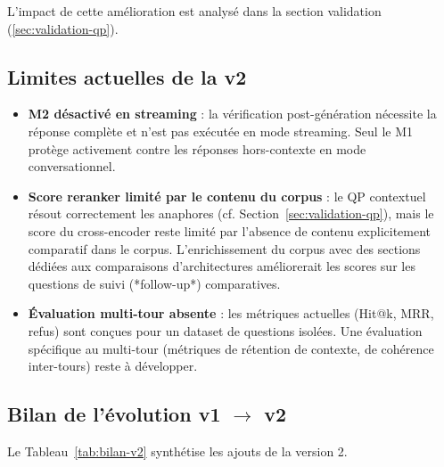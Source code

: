 L'impact de cette amélioration est analysé dans la section validation (\ref{sec:validation-qp}).

\subsection{Limites actuelles de la v2}

\begin{itemize}
  \item \textbf{M2 désactivé en streaming} : la vérification post-génération nécessite la réponse complète et n'est pas exécutée en mode streaming. Seul le M1 protège activement contre les réponses hors-contexte en mode conversationnel.

  \item \textbf{Score reranker limité par le contenu du corpus} : le QP contextuel résout correctement les anaphores (cf. Section~\ref{sec:validation-qp}), mais le score du cross-encoder reste limité par l'absence de contenu explicitement comparatif dans le corpus. L'enrichissement du corpus avec des sections dédiées aux comparaisons d'architectures améliorerait les scores sur les questions de suivi (*follow-up*) comparatives.

  \item \textbf{Évaluation multi-tour absente} : les métriques actuelles (Hit@k, MRR, refus) sont conçues pour un dataset de questions isolées. Une évaluation spécifique au multi-tour (métriques de rétention de contexte, de cohérence inter-tours) reste à développer.
\end{itemize}

\subsection{Bilan de l'évolution v1 $\rightarrow$ v2}

Le Tableau~\ref{tab:bilan-v2} synthétise les ajouts de la version 2.

